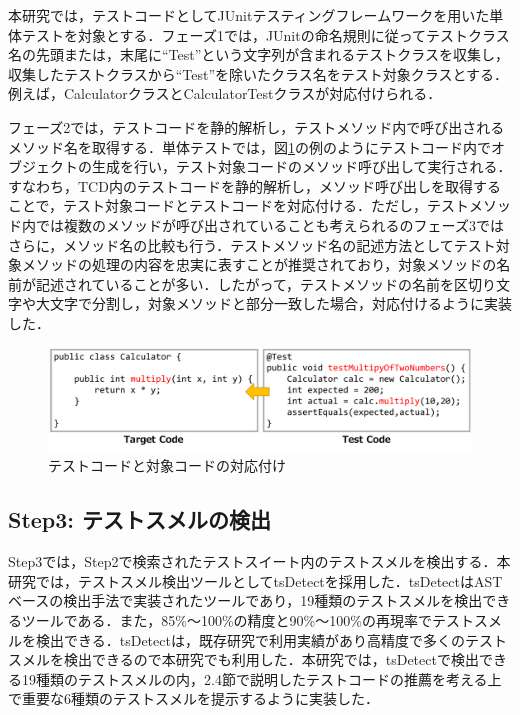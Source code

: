 \documentclass[12pt]{jarticle} %
\begin{document}
本研究では，テストコードとしてJUnitテスティングフレームワークを用いた単体テストを対象とする．フェーズ1では，JUnitの命名規則に従ってテストクラス名の先頭または，末尾に``Test''という文字列が含まれるテストクラスを収集し，収集したテストクラスから``Test''を除いたクラス名をテスト対象クラスとする．例えば，CalculatorクラスとCalculatorTestクラスが対応付けられる．

フェーズ2では，テストコードを静的解析し，テストメソッド内で呼び出されるメソッド名を取得する．単体テストでは，図\ref{map}の例のようにテストコード内でオブジェクトの生成を行い，テスト対象コードのメソッド呼び出して実行される．すなわち，TCD内のテストコードを静的解析し，メソッド呼び出しを取得することで，テスト対象コードとテストコードを対応付ける．ただし，テストメソッド内では複数のメソッドが呼び出されていることも考えられるのフェーズ3ではさらに，メソッド名の比較も行う．テストメソッド名の記述方法としてテスト対象メソッドの処理の内容を忠実に表すことが推奨されており，対象メソッドの名前が記述されていることが多い\cite{b22}．したがって，テストメソッドの名前を区切り文字や大文字で分割し，対象メソッドと部分一致した場合，対応付けるように実装した．

\begin{figure}[htbp]
  \begin{center}
    \includegraphics[clip,width=15cm]{mapping.pdf}
    \caption{テストコードと対象コードの対応付け}
    \label{map}
  \end{center}
\end{figure}

\subsection{Step3: テストスメルの検出}

Step3では，Step2で検索されたテストスイート内のテストスメルを検出する．本研究では，テストスメル検出ツールとして{\sf tsDetect}\cite{Peruma}を採用した．{\sf tsDetect}はASTベースの検出手法で実装されたツールであり，19種類のテストスメルを検出できるツールである．また，85\%〜100\%の精度と90\%〜100\%の再現率でテストスメルを検出できる．{\sf tsDetect}は，既存研究で利用実績があり高精度で多くのテストスメルを検出できるので本研究でも利用した．本研究では，{\sf tsDetect}で検出できる19種類のテストスメルの内，2.4節で説明したテストコードの推薦を考える上で重要な6種類のテストスメルを提示するように実装した．
\end{document}
